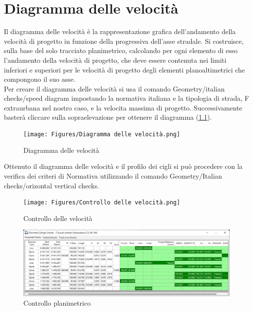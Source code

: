 \chapter{Diagramma delle velocità}
Il diagramma delle velocità è la rappresentazione grafica dell'andamento della velocità di progetto in funzione della progressiva dell'asse stradale. Si costruisce, sulla base del solo tracciato planimetrico, calcolando per ogni elemento di esso l'andamento della velocità di progetto, che deve essere contenuta nei limiti inferiori e superiori per le velocità di progetto degli elementi planoaltimetrici che compongono il suo asse.
\leavevmode\\
Per creare il diagramma delle velocità si usa il comando Geometry/italian checks/speed diagram impostando la normativa italiana e la tipologia di strada, F extraurbana nel nostro caso, e la velocita massima di progetto. Successivamente basterà cliccare sulla sopraelevazione per ottenere il diagramma (\ref{Diagramma delle velocità}).

\begin{figure}[H]
    \texttt{[image: Figures/Diagramma delle velocità.png]}
      \caption{Diagramma delle velocità}
      \label{Diagramma delle velocità}
\end{figure}

Ottenuto il diagramma delle velocità e il profilo dei cigli si può procedere con la verifica  dei criteri di Normativa utilizzando il comando Geometry/Italian checks/orizontal vertical checks.

\begin{figure}[H]
    \texttt{[image: Figures/Controllo delle velocità.png]}
      \caption{Controllo delle velocità}
      \label{Controllo delle velocità}
\end{figure}

\begin{figure}[H]
    \centering
      \includegraphics[width=\textwidth]{Figures/Controllo planimetrico.png}
      \caption{Controllo planimetrico}
      \label{Controllo planimetrico}
\end{figure}


